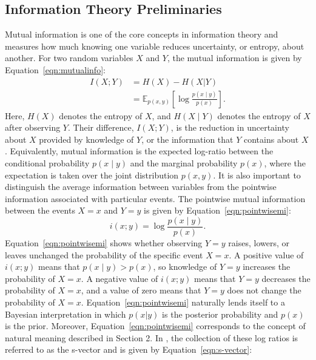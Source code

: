 \documentclass[pdflatex,sn-mathphys-num]{sn-jnl}
\theoremstyle{thmstylethree}
\theoremstyle{thmstyleone}
\begin{document}
\subsection{Information Theory Preliminaries}
Mutual information is one of the core concepts in information theory and measures how much knowing one variable reduces uncertainty, or entropy, about another. For two random variables $X$ and $Y$, the mutual information is given by Equation~\ref{eqn:mutualinfo}:
\begin{align}
\label{eqn:mutualinfo}
    I(X;Y)
    &= H(X) - H(X \vert Y)\\
    &= \mathbb{E}_{p(x,y)}
    \left[
        \log \frac{p(x \mid y)}{p(x)}
    \right].
\end{align}
Here, $H(X)$ denotes the entropy of $X$, and $H(X \mid Y)$ denotes the entropy of $X$ after observing $Y$. Their difference, $I(X;Y)$, is the reduction in uncertainty about $X$ provided by knowledge of $Y$, or the information that $Y$ contains about $X$. Equivalently, mutual information is the expected log-ratio between the conditional probability $p(x \mid y)$ and the marginal probability $p(x)$, where the expectation is taken over the joint distribution $p(x,y)$. It is also important to distinguish the average information between variables from the pointwise information associated with particular events. %
The pointwise mutual information between the events $X=x$ and $Y=y$ is given by Equation~\ref{eqn:pointwisemi}:
\begin{equation}
\label{eqn:pointwisemi}
    i(x;y)
    =
    \log
    \frac{p(x \mid y)}{p(x)}.
\end{equation}
Equation~\ref{eqn:pointwisemi} shows whether observing $Y=y$ raises, lowers, or leaves unchanged the probability of the specific event $X=x$. A positive value of $i(x;y)$ means that $p(x \mid y) > p(x)$, so knowledge of $Y=y$ increases the probability of $X=x$. A negative value of $i(x;y)$ means that $Y=y$ decreases the probability of $X=x$, and a value of zero means that $Y=y$ does not change the probability of $X=x$. Equation~\ref{eqn:pointwisemi} naturally lends itself to a Bayesian interpretation in which $p(x |y)$ is the posterior probability and $p(x)$ is the prior. Moreover,  Equation~\ref{eqn:pointwisemi} corresponds to the concept of natural meaning described in Section 2. In \cite{isaac2019semantics}, the collection of these log ratios is referred to as the s-vector and is given by Equation~\ref{eqn:s-vector}:
\end{document}
